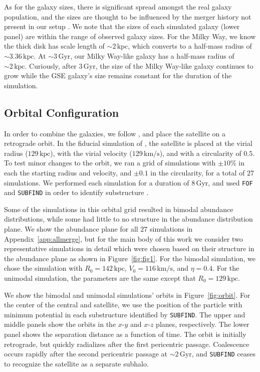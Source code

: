 \documentclass[linenumbers, twocolumn]{aastex631}
\newcommand{\Gyr}{\ensuremath{\textrm{Gyr}}}
\newcommand{\kpc}{\ensuremath{\textrm{kpc}}}
\newcommand{\kms}{\ensuremath{\textrm{km}/\textrm{s}}}
\begin{document}
As for the galaxy sizes, there is significant spread amongst the real galaxy population, and the sizes are thought to be influenced by the merger history not present in our setup \citep[e.g.][]{2014ApJ...788...28V}. We note that the sizes of each simulated galaxy (lower panel) are within the range of observed galaxy sizes. For the Milky Way, we know the thick disk has scale length of $\sim2\,\kpc$, which converts to a half-mass radius of $\sim3.36\,\kpc$. At $\sim3\,\Gyr$, our Milky Way-like galaxy has a half-mass radius of $\sim2\,\kpc$. Curiously, after $3\,\Gyr$, the size of the Milky Way-like galaxy continues to grow while the GSE galaxy's size remains constant for the duration of the simulation.

\subsection{Orbital Configuration}\label{ssec:orbit_setup}
In order to combine the galaxies, we follow \citet{2021ApJ...923...92N}, and place the satellite on a retrograde orbit. In the fiducial simulation of \citet{2021ApJ...923...92N}, the satellite is placed at the virial radius ($129\,\kpc$), with the virial velocity ($129\,\kms$), and with a circularity of $0.5$. To test minor changes to the orbit, we ran a grid of simulations with $\pm10\%$ in each the starting radius and velocity, and $\pm0.1$ in the circularity, for a total of $27$ simulations. We performed each simulation for a duration of $8\,\Gyr$, and used \texttt{FOF} and \texttt{SUBFIND} in order to identify substructure \citep{2005Natur.435..629S,2009MNRAS.399..497D}.

Some of the simulations in this orbital grid resulted in bimodal abundance distributions, while some had little to no structure in the abundance distribution plane. We show the abundance plane for all $27$ simulations in Appendix~\ref{app:allmerge}, but for the main body of this work we consider two representative simulations in detail which were chosen based on their structure in the abundance plane as shown in Figure~\ref{fig:fig1}. For the bimodal simulation, we chose the simulation with $R_0=142\,\kpc$, $V_0=116\,\kms$, and $\eta=0.4$. For the unimodal simulation, the parameters are the same except that $R_0=129\,\kpc$.

We show the bimodal and unimodal simulations' orbits in Figure~\ref{fig:orbit}. For the center of the central and satellite, we use the position of the particle with minimum potential in each substructure identified by \texttt{SUBFIND}. The upper and middle panels show the orbits in the $x$-$y$ and $x$-$z$ planes, respectively. The lower panel shows the separation distance as a function of time. The orbit is initially retrograde, but quickly radializes after the first pericentric passage. Coalescence occurs rapidly after the second pericentric passage at $\sim2\,\Gyr$, and \texttt{SUBFIND} ceases to recognize the satellite as a separate subhalo.
\end{document}
